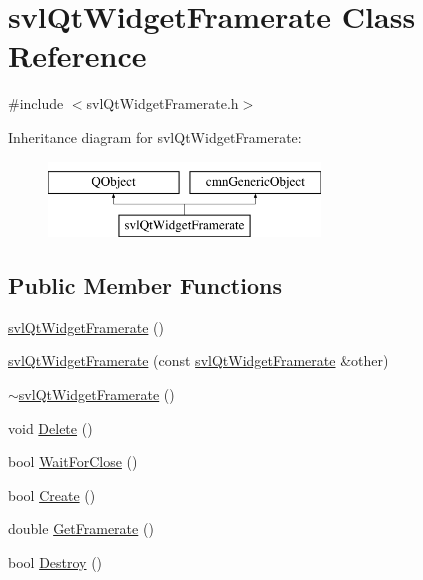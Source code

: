 \hypertarget{classsvl_qt_widget_framerate}{}\section{svl\+Qt\+Widget\+Framerate Class Reference}
\label{classsvl_qt_widget_framerate}


{\ttfamily \#include $<$svl\+Qt\+Widget\+Framerate.\+h$>$}

Inheritance diagram for svl\+Qt\+Widget\+Framerate\+:\begin{figure}[H]
\begin{center}
\leavevmode
\includegraphics[height=2.000000cm]{d0/dd1/classsvl_qt_widget_framerate}
\end{center}
\end{figure}
\subsection*{Public Member Functions}
\begin{DoxyCompactItemize}
\item 
\hyperlink{classsvl_qt_widget_framerate_a46ce5fabc690f1cd4be48bce5a9a14c0}{svl\+Qt\+Widget\+Framerate} ()
\item 
\hyperlink{classsvl_qt_widget_framerate_a35bfc2e11d1940e4a20fb0893ae43544}{svl\+Qt\+Widget\+Framerate} (const \hyperlink{classsvl_qt_widget_framerate}{svl\+Qt\+Widget\+Framerate} \&other)
\item 
\hyperlink{classsvl_qt_widget_framerate_a3296abfae896799ad64bb4455b86a6c2}{$\sim$svl\+Qt\+Widget\+Framerate} ()
\item 
void \hyperlink{classsvl_qt_widget_framerate_a071273cf779afa3c38d85060a24cd4ad}{Delete} ()
\item 
bool \hyperlink{classsvl_qt_widget_framerate_aaa825b90f6192607e299e3d6d18dac07}{Wait\+For\+Close} ()
\item 
bool \hyperlink{classsvl_qt_widget_framerate_a84b2fa8da2774c1c2f9877660c998e65}{Create} ()
\item 
double \hyperlink{classsvl_qt_widget_framerate_aa66b1c470b5148c3c24060b311d45764}{Get\+Framerate} ()
\item 
bool \hyperlink{classsvl_qt_widget_framerate_ac6b9acb24c686d5f0e664e8b736d705b}{Destroy} ()
\end{DoxyCompactItemize}
